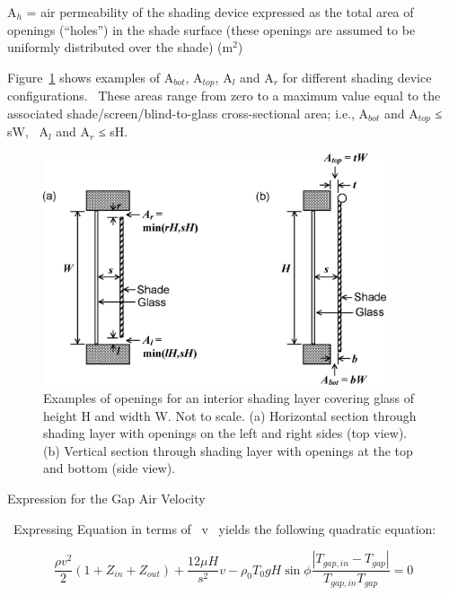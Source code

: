 A\(_{h}\) = air permeability of the shading device expressed as the total area of openings (``holes'') in the shade surface (these openings are assumed to be uniformly distributed over the shade) (m\(^{2}\))

Figure~\ref{fig:examples-of-openings-for-an-interior-shading} shows examples of A\(_{bot}\), A\(_{top}\), A\(_{l}\) and A\(_{r}\) for different shading device configurations.~ These areas range from zero to a maximum value equal to the associated shade/screen/blind-to-glass cross-sectional area; i.e., A\(_{bot}\) and A\(_{top}\) ≤ sW,~ A\(_{l}\) and A\(_{r}\) ≤ sH.

\begin{figure}[hbtp] %
\centering
\includegraphics[width=0.9\textwidth, height=0.9\textheight, keepaspectratio=true]{media/image1679.png}
\caption{Examples of openings for an interior shading layer covering glass of height H and width W. Not to scale. (a) Horizontal section through shading layer with openings on the left and right sides (top view). (b) Vertical section through shading layer with openings at the top and bottom (side view). \protect \label{fig:examples-of-openings-for-an-interior-shading}}
\end{figure}

Expression for the Gap Air Velocity

~Expressing Equation in terms of~ v~ yields the following quadratic equation:

\begin{equation}
\frac{{\rho {v^2}}}{2}\left( {1 + {Z_{in}} + {Z_{out}}} \right) + \frac{{12\mu H}}{{{s^2}}}v - {\rho_0}{T_0}gH\sin \phi \frac{{\left| {{T_{gap,in}} - {T_{gap}}} \right|}}{{{T_{gap,in}}{T_{gap}}}} = 0
\end{equation}


